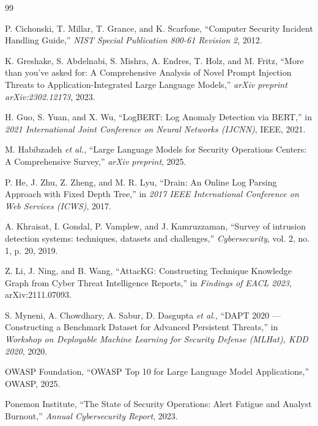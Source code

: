 \documentclass[12pt,a4paper]{article}
\begin{document}
\newpage
{}
\begin{thebibliography}{99}

    P. Cichonski, T. Millar, T. Grance, and K. Scarfone, ``Computer Security Incident Handling Guide,'' \emph{NIST Special Publication 800-61 Revision 2}, 2012.

    K. Greshake, S. Abdelnabi, S. Mishra, A. Endres, T. Holz, and M. Fritz, ``More than you've asked for: A Comprehensive Analysis of Novel Prompt Injection Threats to Application-Integrated Large Language Models,'' \emph{arXiv preprint arXiv:2302.12173}, 2023.

    H. Guo, S. Yuan, and X. Wu, ``LogBERT: Log Anomaly Detection via BERT,'' in \emph{2021 International Joint Conference on Neural Networks (IJCNN)}, IEEE, 2021.

    M. Habibzadeh \emph{et al.}, ``Large Language Models for Security Operations Centers: A Comprehensive Survey,'' \emph{arXiv preprint}, 2025.

    P. He, J. Zhu, Z. Zheng, and M. R. Lyu, ``Drain: An Online Log Parsing Approach with Fixed Depth Tree,'' in \emph{2017 IEEE International Conference on Web Services (ICWS)}, 2017.

    A. Khraisat, I. Gondal, P. Vamplew, and J. Kamruzzaman, ``Survey of intrusion detection systems: techniques, datasets and challenges,'' \emph{Cybersecurity}, vol. 2, no. 1, p. 20, 2019.

    Z. Li, J. Ning, and B. Wang, ``AttacKG: Constructing Technique Knowledge Graph from Cyber Threat Intelligence Reports,'' in \emph{Findings of EACL 2023}, arXiv:2111.07093.

    S. Myneni, A. Chowdhary, A. Sabur, D. Dasgupta \emph{et al.}, ``DAPT 2020 --- Constructing a Benchmark Dataset for Advanced Persistent Threats,'' in \emph{Workshop on Deployable Machine Learning for Security Defense (MLHat), KDD 2020}, 2020.

    OWASP Foundation, ``OWASP Top 10 for Large Language Model Applications,'' OWASP, 2025.

    Ponemon Institute, ``The State of Security Operations: Alert Fatigue and Analyst Burnout,'' \emph{Annual Cybersecurity Report}, 2023.


\end{thebibliography}
\end{document}

